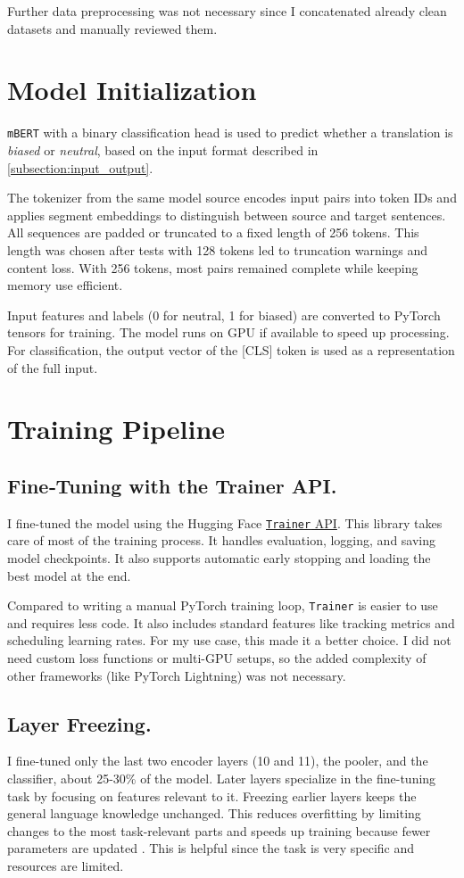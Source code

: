Further data preprocessing was not necessary since I concatenated already clean datasets and manually reviewed them.

\section{Model Initialization}
    \texttt{mBERT} with a binary classification head is used to predict whether a translation is \textit{biased} or \textit{neutral}, based on the input format described in \autoref{subsection:input_output}.

    The tokenizer from the same model source encodes input pairs into token IDs and applies segment embeddings to distinguish between source and target sentences. All sequences are padded or truncated to a fixed length of 256 tokens. This length was chosen after tests with 128 tokens led to truncation warnings and content loss. With 256 tokens, most pairs remained complete while keeping memory use efficient.

    Input features and labels (0 for neutral, 1 for biased) are converted to PyTorch tensors for training. The model runs on GPU if available to speed up processing. For classification, the output vector of the [CLS] token is used as a representation of the full input.

\section{Training Pipeline}
\subsection{{Fine‑Tuning with the Trainer API.}}
    I fine-tuned the model using the Hugging Face \href{https://huggingface.co/docs/transformers/en/main_classes/trainer}{\texttt{Trainer} API}. This library takes care of most of the training process. It handles evaluation, logging, and saving model checkpoints. It also supports automatic early stopping and loading the best model at the end.

    Compared to writing a manual PyTorch training loop, \texttt{Trainer} is easier to use and requires less code. It also includes standard features like tracking metrics and scheduling learning rates. For my use case, this made it a better choice. I did not need custom loss functions or multi-GPU setups, so the added complexity of other frameworks (like PyTorch Lightning) was not necessary.

    \subsection{Layer Freezing.}
    I fine-tuned only the last two encoder layers (10 and 11), the pooler, and the classifier, about 25-30\% of the model. Later layers specialize in the fine-tuning task by focusing on features relevant to it. Freezing earlier layers keeps the general language knowledge unchanged. This reduces overfitting by limiting changes to the most task-relevant parts and speeds up training because fewer parameters are updated \parencite{nadipalliLayerWiseEvolutionRepresentations2025}. This is helpful since the task is very specific and resources are limited.

